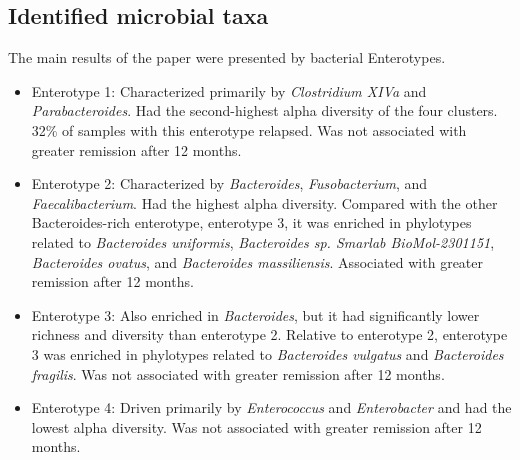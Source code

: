 \documentclass[11pt,a4paper]{article}
\begin{document}
\subsection{Identified microbial taxa}
The main results of the paper were presented by bacterial Enterotypes.
\begin{itemize}
    \item Enterotype 1: Characterized primarily by \textit{Clostridium XIVa} and \textit{Parabacteroides}. Had the second-highest alpha diversity of the four clusters. 32\% of samples with this enterotype relapsed. Was not associated with greater remission after 12 months.
    \item Enterotype 2: Characterized by \textit{Bacteroides}, \textit{Fusobacterium}, and \textit{Faecalibacterium}. Had the highest alpha diversity. Compared with the other Bacteroides-rich enterotype, enterotype 3, it was enriched in phylotypes related to \textit{Bacteroides uniformis}, \textit{Bacteroides sp. Smarlab BioMol-2301151}, \textit{Bacteroides ovatus}, and \textit{Bacteroides massiliensis}. Associated with greater remission after 12 months. 
    \item Enterotype 3: Also enriched in \textit{Bacteroides}, but it had significantly lower richness and diversity than enterotype 2. Relative to enterotype 2, enterotype 3 was enriched in phylotypes related to \textit{Bacteroides vulgatus} and \textit{Bacteroides fragilis}. Was not associated with greater remission after 12 months.
    \item Enterotype 4: Driven primarily by \textit{Enterococcus} and \textit{Enterobacter} and had the lowest alpha diversity. Was not associated with greater remission after 12 months.
\end{itemize}
\end{document}
